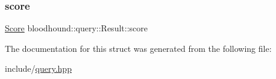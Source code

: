 \mbox{\label{structbloodhound_1_1query_1_1Result_af9f240e486460b5130eff110b0f3c7a3}} 
\subsubsection{\texorpdfstring{score}{score}}
{\footnotesize\ttfamily \hyperlink{structbloodhound_1_1Score}{Score} bloodhound\+::query\+::\+Result\+::score}



The documentation for this struct was generated from the following file\+:\begin{DoxyCompactItemize}
\item 
include/\hyperlink{query_8hpp}{query.\+hpp}\end{DoxyCompactItemize}
